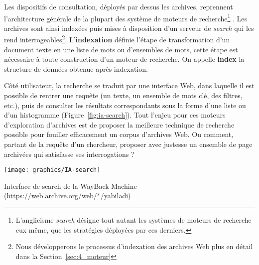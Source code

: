 \documentclass[symmetric,justified,marginals=raggedouter]{tufte-book}
\begin{document}
Les dispositifs de consultation, déployés par dessus les archives, reprennent l'architecture générale de la plupart des système de moteurs de recherche\footnote{\RaggedOuter L'anglicisme \textit{search} désigne tout autant les systèmes de moteurs de recherche eux même, que les stratégies déployées par ces derniers.} \citep{grainger_solr_2014,hatcher_lucene_2004}. Les archives sont ainsi indexées puis mises à disposition d'un serveur de \textit{search} qui les rend interrogeables\footnote{\RaggedOuter Nous développerons le processus d'indexation des archives Web plus en détail dans la Section~\ref{sec:4_moteur}}. L'\textbf{indexation} définie l'étape de transformation d'un document texte en une liste de mots ou d'ensembles de mots, cette étape est nécessaire à toute construction d'un moteur de recherche. On appelle \textbf{index} la structure de données obtenue après indexation. 

Côté utilisateur, la recherche se traduit par une interface Web, dans laquelle il est possible de rentrer une requête (un texte, un ensemble de mots clé, des filtres, etc.), puis de consulter les résultats correspondants sous la forme d'une liste ou d'un histogramme (Figure~\ref{fig:ia-search}). Tout l'enjeu pour ces moteurs d'exploration d'archives est de proposer la meilleure technique de recherche possible pour fouiller efficacement un corpus d'archives Web. Ou comment, partant de la requête d'un chercheur, proposer avec justesse un ensemble de page archivées qui satisfasse ses interrogations ?

\begin{marginfigure}%
  \texttt{[image: graphics/IA-search]}
  \caption{Interface de search de la WayBack Machine (\url{https://web.archive.org/web/*/yabiladi})}
  \label{fig:ia-search}
\end{marginfigure} 
\end{document}
